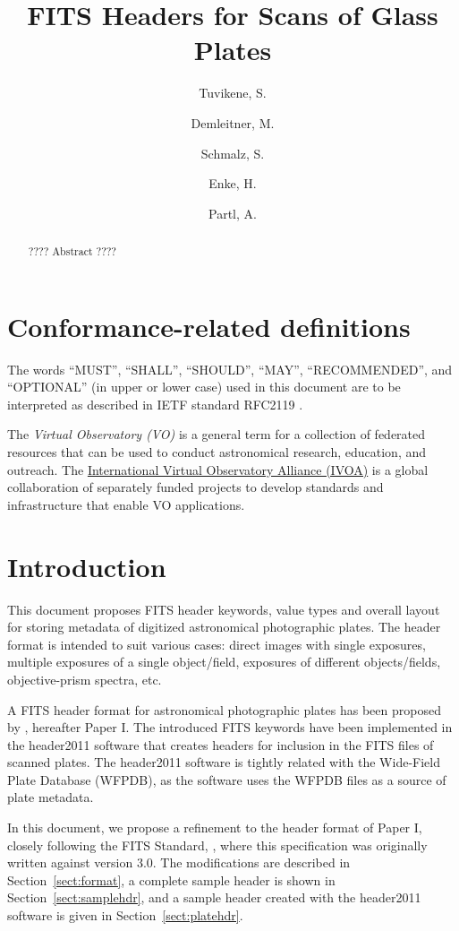\documentclass[11pt]{ivoa}
\title{FITS Headers for Scans of Glass Plates}
\author{Tuvikene, S.}
\author{Demleitner, M.}
\author{Schmalz, S.}
\author{Enke, H.}
\author{Partl, A.}
\begin{document}
\begin{abstract}
???? Abstract ????
\end{abstract}


\section*{Conformance-related definitions}

The words ``MUST'', ``SHALL'', ``SHOULD'', ``MAY'', ``RECOMMENDED'', and
``OPTIONAL'' (in upper or lower case) used in this document are to be
interpreted as described in IETF standard RFC2119 \citep{std:RFC2119}.

The \emph{Virtual Observatory (VO)} is a
general term for a collection of federated resources that can be used
to conduct astronomical research, education, and outreach.
The \href{https://www.ivoa.net}{International
Virtual Observatory Alliance (IVOA)} is a global
collaboration of separately funded projects to develop standards and
infrastructure that enable VO applications.


\section{Introduction}

This document  proposes FITS header keywords, value types and overall
layout for storing metadata of digitized astronomical photographic
plates. The header format is intended to suit various cases: direct
images with single exposures, multiple exposures of a single
object/field, exposures of different objects/fields, objective-prism
spectra, etc.

A FITS header format for astronomical photographic plates has been
proposed by \citet{2012PASRB..11..147K},
hereafter Paper I. The introduced FITS keywords have been implemented in
the header2011 software \citep{soft:header2011} that creates headers
for inclusion in the FITS files of scanned plates. The header2011
software is tightly related with the Wide-Field Plate Database (WFPDB),
as the software uses the WFPDB files as a source of
plate metadata.

In this document, we propose a refinement to the header format of Paper
I, closely following the FITS Standard, \citep{std:FITS}, where this
specification was originally written against version 3.0. The
modifications are described in Section~\ref{sect:format}, a complete
sample header is shown in Section~\ref{sect:samplehdr}, and a sample
header created with the header2011 software is given in
Section~\ref{sect:platehdr}.
\end{document}
